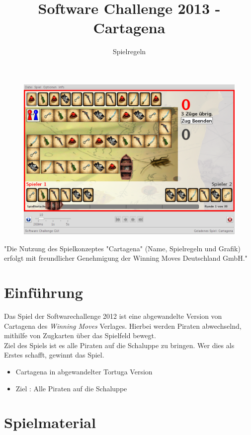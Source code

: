 \documentclass{scrartcl}
\title{Software Challenge 2013 - Cartagena}
\subtitle{Spielregeln}
\newcommand{\EmptyPlainPage}{\newpage\thispagestyle{plain}\ \newpage}
\begin{document}
\maketitle

\begin{figure}[h]
	\centering
	\includegraphics[width=\linewidth]{bilder/Uebersicht.png}
\end{figure}

"Die Nutzung des Spielkonzeptes "Cartagena" (Name, Spielregeln und Grafik)
erfolgt mit freundlicher Genehmigung der Winning Moves Deutschland GmbH."
\newpage
\tableofcontents
\EmptyPlainPage

\section{Einführung}
Das Spiel der Softwarechallenge 2012 ist eine abgewandelte Version von Cartagena
des \emph{Winning Moves} Verlages. Hierbei werden Piraten abwechselnd, mithilfe
von Zugkarten über das Spielfeld bewegt.\\

Ziel des Spiels ist es alle Piraten auf die Schaluppe zu bringen. Wer dies als
Erstes schafft, gewinnt das Spiel.
\begin{itemize}
  \item Cartagena in abgewandelter Tortuga Version
  \item Ziel : Alle Piraten auf die Schaluppe
\end{itemize}

\section{Spielmaterial}
\end{document}
